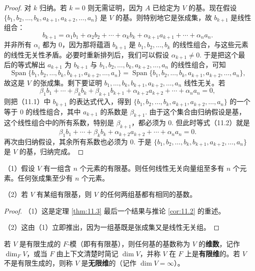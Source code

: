 \begin{proof}
对 \(k\) 归纳。若 \(k = 0\) 则无需证明，因为 \(A\) 已给定为 \(V\) 的基。现在假设 \(\{b_1, b_2, \ldots, b_k, a_{k+1}, a_{k+2}, \ldots, a_n\}\) 是 \(V\) 的基。则特别地它是张成集，故 \(b_{k+1}\) 是线性组合：
\begin{equation}
b_{k+1} = \alpha_1b_1+\alpha_2b_2+\cdots+\alpha_kb_k+\alpha_{k+1}a_{k+1}+\cdots+\alpha_na_n. \tag{11.1}
\end{equation}
并非所有 \(\alpha_i\) 都为 0，因为那将蕴涵 \(b_{k+1}\) 是 \(b_1, b_2, \ldots, b_k\) 的线性组合，与这些元素的线性无关性矛盾。必要时重新排列后，我们可以假设 \(\alpha_{k+1} \neq 0\). 于是把这个最后的等式解出 \(a_{k+1}\) 为 \(b_{k+1}\) 与 \(b_1, b_2, \ldots, b_k, a_{k+2}, \ldots, a_n\) 的线性组合，可知
\[
\operatorname{Span}\{b_1, b_2, \ldots, b_k, b_{k+1}, a_{k+2}, \ldots, a_n\} = \operatorname{Span}\{b_1, b_2, \ldots, b_k, a_{k+1}, a_{k+2}, \ldots, a_n\},
\]
故这是 \(V\) 的张成集。剩下要证明 \(b_1, \ldots, b_k, b_{k+1}, a_{k+2}, \ldots, a_n\) 线性无关。若
\begin{equation}
\beta_1b_1+\cdots+\beta_kb_k+\beta_{k+1}b_{k+1}+\alpha_{k+2}a_{k+2}+\cdots+\alpha_na_n = 0, \tag{11.2}
\end{equation}
则把（11.1）中 \(b_{k+1}\) 的表达式代入，得到 \(\{b_1, b_2, \ldots, b_k, a_{k+1}, a_{k+2}, \ldots, a_n\}\) 的一个等于 0 的线性组合，其中 \(a_{k+1}\) 的系数是 \(\beta_{k+1}\). 由于这个集合由归纳假设是基，这个线性组合中的所有系数，特别是 \(\beta_{k+1}\)，都必须为 0. 但此时等式（11.2）就是
\[
\beta_1b_1+\cdots+\beta_kb_k+\alpha_{k+2}a_{k+2}+\cdots+\alpha_na_n = 0.
\]
再次由归纳假设，其余所有系数也必须为 0. 于是 \(\{b_1, b_2, \ldots, b_k, b_{k+1}, a_{k+2}, \ldots, a_n\}\) 是 \(V\) 的基，归纳完成。
\end{proof}

\begin{corollary}\label{cor:11.4}
（1）假设 \(V\) 有一组含 \(n\) 个元素的有限基。则任何线性无关向量组至多有 \(n\) 个元素。任何张成集至少有 \(n\) 个元素。

（2）若 \(V\) 有某组有限基，则 \(V\) 的任何两组基都有相同的基数。
\end{corollary}

\begin{proof}
（1）这是定理 \ref{thm:11.3} 最后一个结果与推论 \ref{cor:11.2} 的重述。

（2）这由（1）立即推出，因为一组基既是张成集又是线性无关组。
\end{proof}

\begin{definition}
若 \(V\) 是有限生成的 \(F\)-模（即有有限基），则任何基的基数称为 \(V\) 的\textbf{维数}，记作 \(\dim_F V\)，或当 \(F\) 由上下文清楚时简记 \(\dim V\)，并称 \(V\) 在 \(F\) 上是\textbf{有限维}的。若 \(V\) 不是有限生成的，则称 \(V\) 是\textbf{无限维}的（记作 \(\dim V = \infty\)）。
\end{definition}

